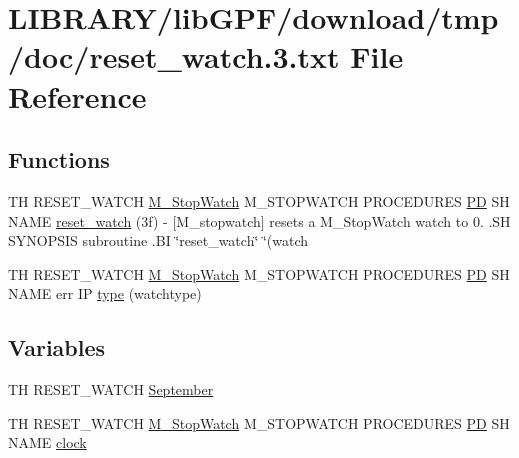 \hypertarget{reset__watch_83_8txt}{}\section{L\+I\+B\+R\+A\+R\+Y/lib\+G\+P\+F/download/tmp/doc/reset\+\_\+watch.3.txt File Reference}
\label{reset__watch_83_8txt}
\subsection*{Functions}
\begin{DoxyCompactItemize}
\item 
TH R\+E\+S\+E\+T\+\_\+\+W\+A\+T\+CH \hyperlink{option__stopwatch_83_8txt_aa2011fc45a5e502e87ee50996a8a9305}{M\+\_\+\+Stop\+Watch} M\+\_\+\+S\+T\+O\+P\+W\+A\+T\+CH P\+R\+O\+C\+E\+D\+U\+R\+ES \hyperlink{what__overview_81_8txt_a85f26da5a4481fbdb0d9c79f2b94de3e}{PD} SH N\+A\+ME \hyperlink{reset__watch_83_8txt_a8979fe90312513c8e2e928e5b426d683}{reset\+\_\+watch} (3f) -\/ \mbox{[}\+M\+\_\+stopwatch\mbox{]} resets a M\+\_\+\+Stop\+Watch watch to 0. .\+S\+H S\+Y\+N\+O\+P\+S\+I\+S subroutine .\+B\+I \char`\"{}reset\+\_\+watch\char`\"{} \char`\"{}(watch
\item 
TH R\+E\+S\+E\+T\+\_\+\+W\+A\+T\+CH \hyperlink{option__stopwatch_83_8txt_aa2011fc45a5e502e87ee50996a8a9305}{M\+\_\+\+Stop\+Watch} M\+\_\+\+S\+T\+O\+P\+W\+A\+T\+CH P\+R\+O\+C\+E\+D\+U\+R\+ES \hyperlink{what__overview_81_8txt_a85f26da5a4481fbdb0d9c79f2b94de3e}{PD} SH N\+A\+ME err IP \hyperlink{reset__watch_83_8txt_a69ae41268dbeb10a64f113e549021710}{type} (watchtype)
\end{DoxyCompactItemize}
\subsection*{Variables}
\begin{DoxyCompactItemize}
\item 
TH R\+E\+S\+E\+T\+\_\+\+W\+A\+T\+CH \hyperlink{reset__watch_83_8txt_a75ad10929d982abab45eddd5a9ee9490}{September}
\item 
TH R\+E\+S\+E\+T\+\_\+\+W\+A\+T\+CH \hyperlink{option__stopwatch_83_8txt_aa2011fc45a5e502e87ee50996a8a9305}{M\+\_\+\+Stop\+Watch} M\+\_\+\+S\+T\+O\+P\+W\+A\+T\+CH P\+R\+O\+C\+E\+D\+U\+R\+ES \hyperlink{what__overview_81_8txt_a85f26da5a4481fbdb0d9c79f2b94de3e}{PD} SH N\+A\+ME \hyperlink{reset__watch_83_8txt_a6edaf77670f85062a402406bd5a409b1}{clock}
\end{DoxyCompactItemize}



